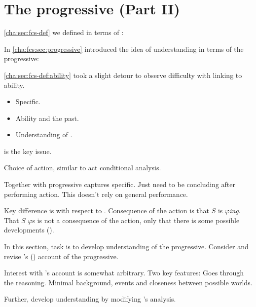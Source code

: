 \section{The progressive (Part II)}
\label{cha:sec:fcs-def:progressive}

\begin{note}
  \autoref{cha:sec:fcs-def} we defined  in terms of :

  \vspace{-\baselineskip}
  \begin{quote}
  \end{quote}

  In \autoref{cha:fcs:sec:progressive} introduced the idea of understanding  in terms of the progressive:

  \vspace{-\baselineskip}
  \begin{quote}
  \end{quote}

  \autoref{cha:sec:fcs-def:ability} took a slight detour to observe difficulty with linking  to ability.
  \begin{itemize}
  \item
    Specific.
  \item
    Ability and the past.
  \item
    Understanding of \AbControl{}.
  \end{itemize}
  \AbControl{} is the key issue.

  Choice of action, similar to act conditional analysis.

  Together with progressive captures specific.
  Just need to be concluding after performing action.
  This doesn't rely on general performance.

  Key difference is with respect to \AbControl{}.
  Consequence of the action is that \(S\) is \(\varphi\)\emph{ing}.
  That \(S\) \(\varphi\)s is not a consequence of the action, only that there is some possible developments ().

  In this section, task is to develop understanding of the progressive.
  Consider and revise \citeauthor{Landman:1992wh}'s (\citeyear{Landman:1992wh}) account of the progressive.

  Interest with \citeauthor{Landman:1992wh}'s account is somewhat arbitrary.
  Two key features:
  Goes through the reasoning.
  Minimal background, events and closeness between possible worlds.

  Further, develop understanding by modifying \citeauthor{Landman:1992wh}'s analysis.
\end{note}

